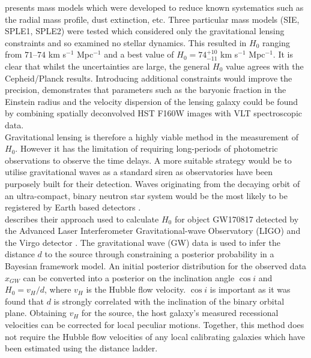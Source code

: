 \documentclass[12pt, onecolumn]{revtex4}    %
\begin{document}
\cite{2003ApJ...599...70K} presents mass models which were developed to reduce known systematics such as the radial mass profile, dust extinction, etc. Three particular mass models (SIE, SPLE1, SPLE2) were tested which considered only the gravitational lensing constraints and so examined no stellar dynamics. This resulted in $H_0$ ranging from $71$--$74$ km s$^{-1}$ Mpc$^{-1}$ and a best value of $H_0=74^{+10}_{-11}$ km s$^{-1}$ Mpc$^{-1}$. It is clear that whilst the uncertainties are large, the general $H_0$ value agrees with the Cepheid/Planck results. Introducing additional constraints would improve the precision, \cite{2011A&A...536A..53C} demonstrates that parameters such as the baryonic fraction in the Einstein radius and the velocity dispersion of the lensing galaxy could be found by combining spatially deconvolved HST F160W images with VLT spectroscopic data. \\

Gravitational lensing is therefore a highly viable method in the measurement of $H_0$. However it has the limitation of requiring long-periods of photometric observations to observe the time delays. A more suitable strategy would be to utilise gravitational waves as a standard siren as observatories have been purposely built for their detection. Waves originating from the decaying orbit of an ultra-compact, binary neutron star system would be the most likely to be registered by Earth based detectors \citep{Schutz:1986aa}. \\

\cite{2017Natur.551...85A} describes their approach used to calculate $H_0$ for object GW170817 detected by the Advanced Laser Interferometer Gravitational-wave Observatory (LIGO) \citep{2015CQGra..32g4001L} and the Virgo detector \citep{2015CQGra..32b4001A}. The gravitational wave (GW) data is used to infer the distance $d$ to the source through constraining a posterior probability in a Bayesian framework model. An initial posterior distribution for the observed data $x_{GW}$ can be converted into a posterior on the inclination angle $\cos{i}$ and $H_0=v_H/d$, where $v_H$ is the Hubble flow velocity. $\cos{i}$ is important as it was found that $d$ is strongly correlated with the inclination of the binary orbital plane. Obtaining $v_H$ for the source, the host galaxy's measured recessional velocities can be corrected for local peculiar motions. Together, this method does not require the Hubble flow velocities of any local calibrating galaxies which have been estimated using the distance ladder. \\
\end{document}
